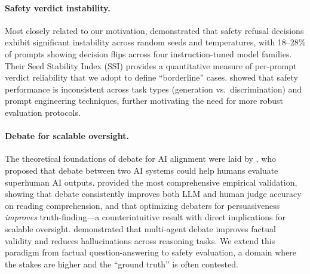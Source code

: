 \documentclass[preprint]{article}
\begin{document}
\paragraph{Safety verdict instability.} Most closely related to our motivation, \citet{dorner2025instability} demonstrated that safety refusal decisions exhibit significant instability across random seeds and temperatures, with 18--28\% of prompts showing decision flips across four instruction-tuned model families. Their Seed Stability Index (SSI) provides a quantitative measure of per-prompt verdict reliability that we adopt to define ``borderline'' cases. \citet{sgbench2024} showed that safety performance is inconsistent across task types (generation vs.\ discrimination) and prompt engineering techniques, further motivating the need for more robust evaluation protocols.

\paragraph{Debate for scalable oversight.} The theoretical foundations of debate for AI alignment were laid by \citet{irving2018debate}, who proposed that debate between two AI systems could help humans evaluate superhuman AI outputs. \citet{khan2024debating} provided the most comprehensive empirical validation, showing that debate consistently improves both LLM and human judge accuracy on reading comprehension, and that optimizing debaters for persuasiveness \emph{improves} truth-finding---a counterintuitive result with direct implications for scalable oversight. \citet{du2023debate} demonstrated that multi-agent debate improves factual validity and reduces hallucinations across reasoning tasks. We extend this paradigm from factual question-answering to safety evaluation, a domain where the stakes are higher and the ``ground truth'' is often contested.

\end{document}
